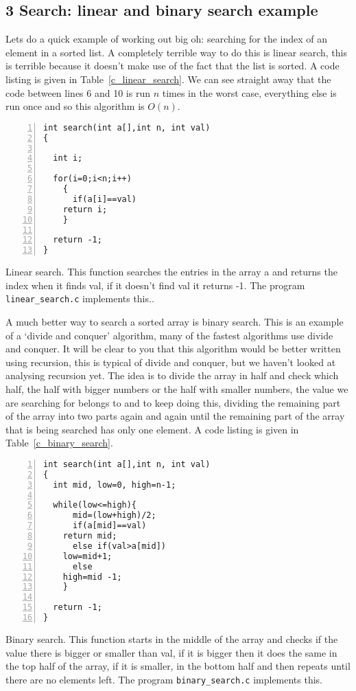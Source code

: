 \documentclass[11pt,a4paper]{scrartcl}
\begin{document}
\subsection*{3 Search: linear and binary search example}

Lets do a quick example of working out big oh: searching for the index
of an element in a sorted list. A completely terrible way to do this
is linear search, this is terrible because it doesn't make use of the
fact that the list is sorted. A code listing is given in
Table~\ref{c_linear_search}. We can see straight away that the code
between lines 6 and 10 is run $n$ times in the worst case, everything
else is run once and so this algorithm is $O(n)$.

\begin{table}
\begin{lstlisting}[numbers=left]
int search(int a[],int n, int val)
{

  int i;

  for(i=0;i<n;i++)
    {
      if(a[i]==val)
	return i;
    }

  return -1;
}
\end{lstlisting}
\caption{Linear search. This function searches the entries in the array a and returns the index when it finds val, if it doesn't find val it returns -1. The program {\tt linear\_search.c} implements this.\label{c_linear_search}.}
\end{table}

A much better way to search a sorted array is binary search. This is
an example of a \lq{}divide and conquer\rq{} algorithm, many of the
fastest algorithms use divide and conquer. It will be clear to you
that this algorithm would be better written using recursion, this is
typical of divide and conquer, but we haven't looked at analysing
recursion yet. The idea is to divide the array in half and check which
half, the half with bigger numbers or the half with smaller numbers,
the value we are searching for belongs to and to keep doing this,
dividing the remaining part of the array into two parts again and again
until the remaining part of the array that is being searched has only
one element. A code listing is given in Table~\ref{c_binary_search}.

\begin{table}
\begin{lstlisting}[numbers=left] 
int search(int a[],int n, int val)
{
  int mid, low=0, high=n-1;

  while(low<=high){
      mid=(low+high)/2;
      if(a[mid]==val)
	return mid;
      else if(val>a[mid])
	low=mid+1;
      else
	high=mid -1;
    }

  return -1;
}
\end{lstlisting}
\caption{Binary search. This function starts in the middle of the array
  and checks if the value there is bigger or smaller than val, if it
  is bigger then it does the same in the top half of the array, if it
  is smaller, in the bottom half and then repeats until there are no
  elements left. The program {\tt binary\_search.c} implements
  this.\label{c_binary_search}}
\end{table}
\end{document}
